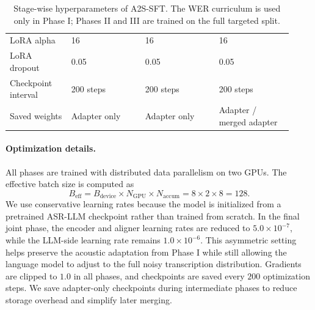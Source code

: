 \documentclass{llmxive}
\begin{document}
\begin{table}[t]
\begin{tabular}{p{0.20\linewidth} p{0.24\linewidth} p{0.24\linewidth} p{0.24\linewidth}}
LoRA alpha
& 16
& 16
& 16 \\

LoRA dropout
& 0.05
& 0.05
& 0.05 \\

Checkpoint interval
& 200 steps
& 200 steps
& 200 steps \\

Saved weights
& Adapter only
& Adapter only
& Adapter / merged adapter \\
\bottomrule
\end{tabular}
\vspace{-2mm}
\caption{
Stage-wise hyperparameters of A2S-SFT. The WER curriculum is used only in
Phase I; Phases II and III are trained on the full targeted split.
}
\label{tab:a2s_sft_stage_hparams}
\end{table}

\paragraph{Optimization details.}
All phases are trained with distributed data parallelism on two GPUs. The
effective batch size is computed as
\[
B_{\mathrm{eff}}
=
B_{\mathrm{device}}
\times N_{\mathrm{GPU}}
\times N_{\mathrm{accum}}
=
8 \times 2 \times 8
=
128.
\]
We use conservative learning rates because the model is initialized from a
pretrained ASR-LLM checkpoint rather than trained from scratch. In the final joint
phase, the encoder and aligner learning rates are reduced to
$5.0\times10^{-7}$, while the LLM-side learning rate remains
$1.0\times10^{-6}$. This asymmetric setting helps preserve the acoustic
adaptation from Phase I while still allowing the language model to adjust to the
full noisy transcription distribution. Gradients are clipped to $1.0$ in all
phases, and checkpoints are saved every $200$ optimization steps. We save
adapter-only checkpoints during intermediate phases to reduce storage overhead
and simplify later merging.
\end{document}
